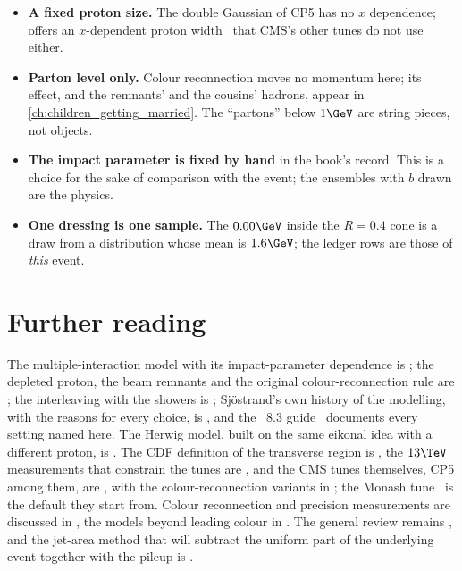\begin{itemize}
    exactly this choice.
  \item \textbf{A fixed proton size.} The double Gaussian of CP5 has no
    $x$ dependence; \PYTHIA offers an $x$-dependent proton
    width~\cite{Corke:2011yy} that CMS's other tunes do not use either.
  \item \textbf{Parton level only.} Colour reconnection moves no momentum
    here; its effect, and the remnants' and the cousins' hadrons, appear in
    \cref{ch:children_getting_married}. The ``partons'' below $1\GeV$ are string
    pieces, not objects.
  \item \textbf{The impact parameter is fixed by hand} in the book's record.
    This is a choice for the sake of comparison with the \CMSSW event; the
    ensembles with $b$ drawn are the physics.
  \item \textbf{One dressing is one sample.} The $0.00\GeV$ inside the
    $R=0.4$ cone is a draw from a distribution whose mean is $1.6\GeV$; the
    ledger rows are those of \emph{this} event.
\end{itemize}

\section{Further reading}
\label{sec:uninvited_cousins:further_reading}
The multiple-interaction model with its impact-parameter dependence is
\cite{Sjostrand:1987su}; the depleted proton, the beam remnants and the
original colour-reconnection rule are \cite{Sjostrand:2004pf}; the
interleaving with the showers is \cite{Sjostrand:2004ef}; Sj\"ostrand's own
history of the modelling, with the reasons for every choice, is
\cite{Sjostrand:2017cdm}, and the \PYTHIA~8.3 guide~\cite{Bierlich:2022pfr}
documents every setting named here. The Herwig model, built on the same
eikonal idea with a different proton, is \cite{Bahr:2008dy}. The CDF
definition of the transverse region is \cite{CDF:2001onq,Field:2002vt}, the
$13\TeV$ measurements that constrain the tunes are
\cite{ATLAS:2017blj,CMS:2017ngy}, and the CMS tunes themselves, CP5 among
them, are \cite{CMS:2019csb}, with the colour-reconnection variants in
\cite{CMS:2022awf}; the Monash tune~\cite{Skands:2014pea} is the \PYTHIA
default they start from. Colour reconnection and precision measurements
are discussed in \cite{Sjostrand:2013cya,Argyropoulos:2014zoa}, the models
beyond leading colour in \cite{Christiansen:2015yqa,Gieseke:2012ft}. The
general review remains \cite{Buckley:2011ms}, and the jet-area method that
will subtract the uniform part of the underlying event together with the
pileup is \cite{Cacciari:2008gn}.

